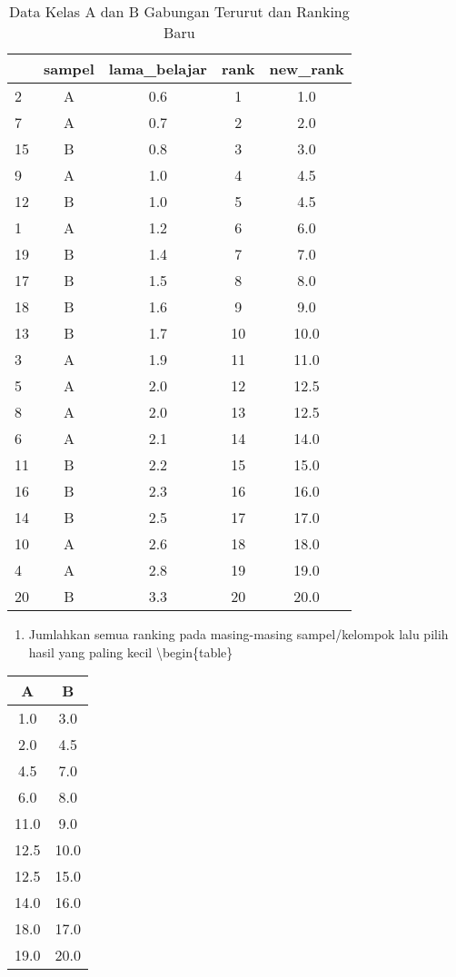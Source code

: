 \documentclass[
]{book}
\providecommand{\tightlist}{%
  \setlength{\itemsep}{0pt}\setlength{\parskip}{0pt}}
\begin{document}
\begin{table}

\caption{\label{tab:unnamed-chunk-13}Data Kelas A dan B Gabungan Terurut dan Ranking Baru}
\centering
\begin{tabular}[t]{l|c|c|c|c}
\hline
  & sampel & lama\_belajar & rank & new\_rank\\
\hline
2 & A & 0.6 & 1 & 1.0\\
\hline
7 & A & 0.7 & 2 & 2.0\\
\hline
15 & B & 0.8 & 3 & 3.0\\
\hline
9 & A & 1.0 & 4 & 4.5\\
\hline
12 & B & 1.0 & 5 & 4.5\\
\hline
1 & A & 1.2 & 6 & 6.0\\
\hline
19 & B & 1.4 & 7 & 7.0\\
\hline
17 & B & 1.5 & 8 & 8.0\\
\hline
18 & B & 1.6 & 9 & 9.0\\
\hline
13 & B & 1.7 & 10 & 10.0\\
\hline
3 & A & 1.9 & 11 & 11.0\\
\hline
5 & A & 2.0 & 12 & 12.5\\
\hline
8 & A & 2.0 & 13 & 12.5\\
\hline
6 & A & 2.1 & 14 & 14.0\\
\hline
11 & B & 2.2 & 15 & 15.0\\
\hline
16 & B & 2.3 & 16 & 16.0\\
\hline
14 & B & 2.5 & 17 & 17.0\\
\hline
10 & A & 2.6 & 18 & 18.0\\
\hline
4 & A & 2.8 & 19 & 19.0\\
\hline
20 & B & 3.3 & 20 & 20.0\\
\hline
\end{tabular}
\end{table}

\begin{enumerate}
\def\labelenumi{\arabic{enumi}.}
\setcounter{enumi}{2}
\tightlist
\item
  Jumlahkan semua ranking pada masing-masing sampel/kelompok lalu pilih hasil yang paling kecil
  \textbackslash begin\{table\}
\end{enumerate}

\caption{\label{tab:unnamed-chunk-14}Data Ranking pada Setiap Kelas}
\centering
\begin{tabular}[t]{c|c}
\hline
A & B\\
\hline
1.0 & 3.0\\
\hline
2.0 & 4.5\\
\hline
4.5 & 7.0\\
\hline
6.0 & 8.0\\
\hline
11.0 & 9.0\\
\hline
12.5 & 10.0\\
\hline
12.5 & 15.0\\
\hline
14.0 & 16.0\\
\hline
18.0 & 17.0\\
\hline
19.0 & 20.0\\
\hline
\end{tabular}
\end{document}
